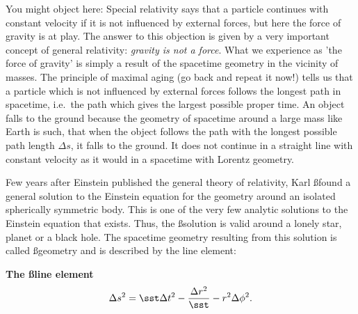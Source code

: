{\begin{multicols}{2}
You might object here: Special relativity says that a particle continues with constant velocity if it is not influenced by external forces, but here the force of gravity is at play. The answer to this objection is given by a very important concept of general relativity: \emph{gravity is not a force}. What we experience as 'the force of gravity' is simply a result of the spacetime geometry in the vicinity of masses. The principle of maximal aging (go back and repeat it now!) tells us that a particle which is not influenced by external forces follows the longest path in spacetime, i.e.\ the path which gives the largest possible proper time. An object falls to the ground because the geometry of spacetime around a large mass like Earth is such, that when the object follows the path with the longest possible path length $\Delta s$, it falls to the ground. It does not continue in a straight line with constant velocity as it would in a spacetime with Lorentz geometry.


Few years after Einstein published the general theory of relativity, Karl \ss found a general solution to the Einstein equation for the geometry around an isolated spherically symmetric body. This is one of the very few analytic solutions to the Einstein equation that exists. Thus, the \ss solution is valid around a lonely star, planet or a black hole. The spacetime geometry resulting from this solution is called \ss geometry and is described by the line element:
\begin{formbox}
\textbf{The \ss line element}
\begin{equation}
\label{eq:ss}
\Delta s^2=\sst\Delta t^2-\frac{\Delta r^2}{\sst}-r^2\Delta\phi^2.
\end{equation}
\end{formbox}



\end{multicols}}
